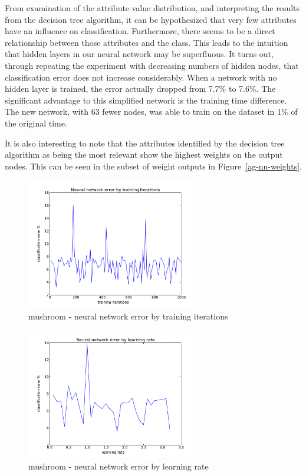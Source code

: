 \documentclass{sig-alternate}
\begin{document}
From examination of the attribute value distribution, and interpreting the results from the decision tree algorithm, it can be hypothesized that very few attributes have an influence on classification. Furthermore, there seems to be a direct relationship between those attributes and the class. This leads to the intuition that hidden layers in our neural network may be superfluous. It turns out, through repeating the experiment with decreasing numbers of hidden nodes, that classification error does not increase considerably. When a network with no hidden layer is trained, the error actually dropped from 7.7\% to 7.6\%. The significant advantage to this simplified network is the training time difference. The new network, with 63 fewer nodes, was able to train on the dataset in 1\% of the original time.

It is also interesting to note that the attributes identified by the decision tree algorithm as being the most relevant show the highest weights on the output nodes. This can be seen in the subset of weight outputs in Figure~\ref{ag-nn-weights}.


\begin{figure}[!htbp]
    \centering
    \includegraphics[width=3in]{data/agaricus-lepiota/perceptron/training-iterations.pdf}
    \caption{mushroom - neural network error by training iterations \label{ag-nn-ti}}
\end{figure} 

\begin{figure}[!htbp]
    \centering
    \includegraphics[width=3in]{data/agaricus-lepiota/perceptron/learning-rate.pdf}
    \caption{mushroom - neural network error by learning rate \label{ag-nn-lr}}
\end{figure} 
\end{document}
